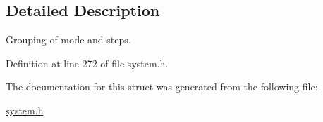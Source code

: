 \subsection{Detailed Description}
Grouping of mode and steps. 

Definition at line 272 of file system.h.

The documentation for this struct was generated from the following file:\begin{CompactItemize}
\item 
\hyperlink{system_8h}{system.h}\end{CompactItemize}

